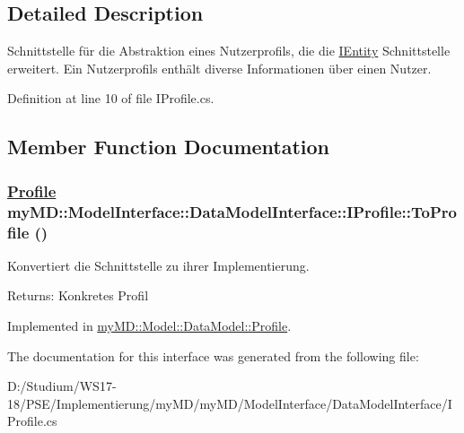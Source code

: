 \subsection{Detailed Description}
Schnittstelle f\"{u}r die Abstraktion eines Nutzerprofils, die die \hyperlink{interfacemy_m_d_1_1_model_interface_1_1_data_model_interface_1_1_i_entity}{IEntity} Schnittstelle erweitert. Ein Nutzerprofils enth\"{a}lt diverse Informationen \"{u}ber einen Nutzer. 



Definition at line 10 of file IProfile.cs.

\subsection{Member Function Documentation}
\hypertarget{interfacemy_m_d_1_1_model_interface_1_1_data_model_interface_1_1_i_profile_9e2661eb12db275911475edec4a72773}{
\subsubsection[ToProfile]{\setlength{\rightskip}{0pt plus 5cm}\hyperlink{classmy_m_d_1_1_model_1_1_data_model_1_1_profile}{Profile} my\-MD::Model\-Interface::Data\-Model\-Interface::IProfile::To\-Profile ()}}
\label{da/d94/interfacemy_m_d_1_1_model_interface_1_1_data_model_interface_1_1_i_profile_9e2661eb12db275911475edec4a72773}


Konvertiert die Schnittstelle zu ihrer Implementierung. 

\begin{Desc}
\item[Returns:]Konkretes Profil\end{Desc}


Implemented in \hyperlink{classmy_m_d_1_1_model_1_1_data_model_1_1_profile_9e2661eb12db275911475edec4a72773}{my\-MD::Model::Data\-Model::Profile}.

The documentation for this interface was generated from the following file:\begin{CompactItemize}
\item 
D:/Studium/WS17-18/PSE/Implementierung/my\-MD/my\-MD/Model\-Interface/Data\-Model\-Interface/IProfile.cs\end{CompactItemize}
